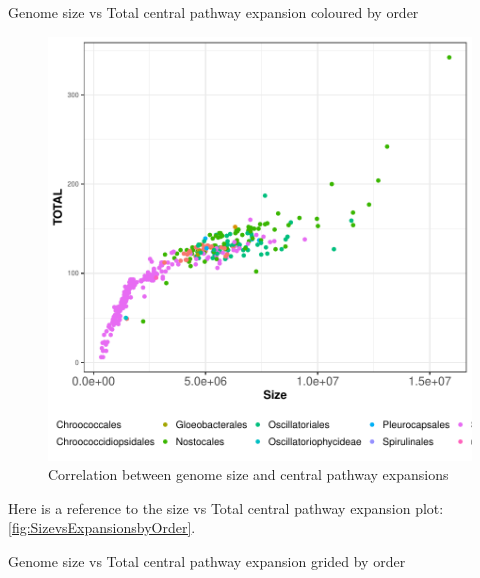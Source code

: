 \documentclass[12pt,twoside]{reedthesis}
\begin{document}
  Genome size vs Total central pathway expansion coloured by order
  
  \begin{figure}[h!tbp]
  \centering
  \includegraphics[angle = 0,scale = 1]{chapter2/Cyanobacteria/SizevsExpansionsbyOrder.pdf}
  \caption[Correlation between genome size and central pathway expansions ]{\normalsize{Correlation between genome size and central pathway expansions }}
  \label{fig:SizevsExpansionsbyOrder}
  \end{figure}
  
  Here is a reference to the size vs Total central pathway expansion plot:
  \autoref{fig:SizevsExpansionsbyOrder}. \clearpage 
  
  Genome size vs Total central pathway expansion grided by order
  
\end{document}
